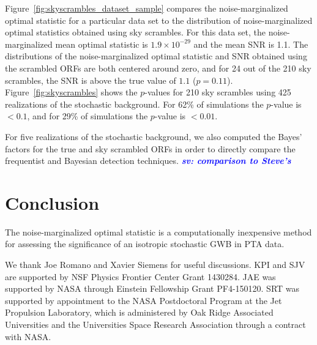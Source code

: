 \documentclass[twocolumn,aps,prd,superscriptaddress]{revtex4-1}
\newcommand{\sv}[1]{\textcolor{blue}{\it{\textbf{sv: #1}}} }
\newcommand{\Agw}{\ensuremath{A_\mathrm{gw}}}
\begin{document}
Figure~\ref{fig:skyscrambles_dataset_sample} compares the noise-marginalized optimal statistic 
for a particular data set to the distribution of noise-marginalized optimal statistics obtained using sky scrambles. 
For this data set, the noise-marginalized mean optimal statistic is 
$1.9\times10^{-29}$ and the mean SNR is 1.1. 
The distributions of the noise-marginalized optimal statistic and SNR obtained using the scrambled ORFs 
are both centered around zero, 
and for 24 out of the 210 sky scrambles, the SNR is above the true value of $1.1$ ($p=0.11$). 
Figure~\ref{fig:skyscrambles} shows the $p$-values for 210 sky scrambles 
using 425 realizations of the stochastic background. 
For 62\% of simulations the $p$-value is $<0.1$, and for 29\% of simulations the $p$-value is $<0.01$.

For five realizations of the stochastic background, we also computed the Bayes' factors for the 
true and sky scrambled ORFs in order to directly compare 
the frequentist and Bayesian detection techniques.
\sv{comparison to Steve's}


\section{Conclusion}
\label{sec:conclusion}

The noise-marginalized optimal statistic is a computationally inexpensive 
method for assessing the significance of an isotropic stochastic GWB in 
PTA data.


\acknowledgments
We thank Joe Romano and Xavier Siemens for useful discussions. 
KPI and SJV are supported by NSF Physics Frontier Center Grant 1430284.
JAE was supported by NASA through Einstein Fellowship Grant PF4-150120. 
SRT was supported by appointment to the NASA Postdoctoral Program 
at the Jet Propulsion Laboratory, which is administered by Oak Ridge Associated Universities 
and the Universities Space Research Association through a contract with NASA. 




\end{document}
